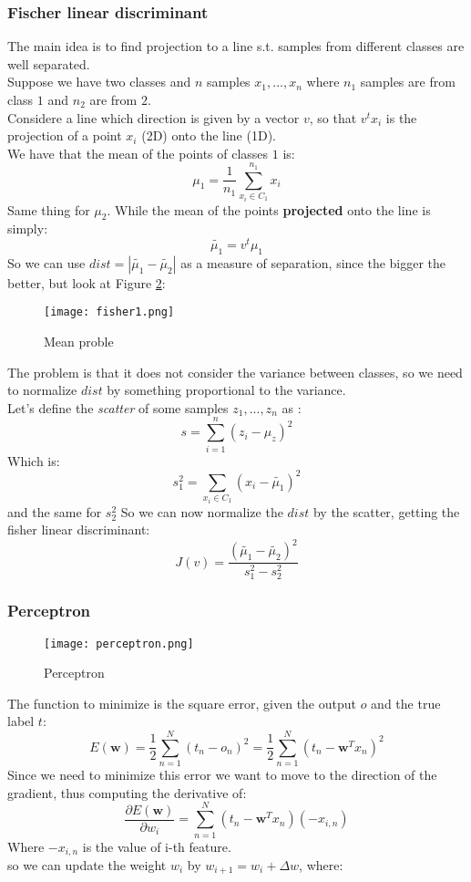 \subsubsection{Fischer linear discriminant}
The main idea is to find projection to a line s.t. samples from different classes are well separated.\\
Suppose we have two classes and $n$ samples $x_1,...,x_n$ where $n_1$ samples are from class $1$ and $n_2$ are from $2$.\\
Considere a line which direction is given by a vector $v$, so that $v^tx_i$ is the projection of a point $x_i$ (2D) onto the line (1D).\\
We have that the mean of the points of classes $1$ is:
\[\mu_1=\frac{1}{n_1}\sum_{x_i \in C_1}^{n_1}x_i\]
Same thing for $\mu_2$. While the mean of the points \textbf{projected} onto the line is simply:
\[\tilde{\mu_1}=v^t\mu_1\]
So we can use $dist=|\tilde{\mu_1} -\tilde{\mu_2}|$ as a measure of separation, since the bigger the better, but look at Figure \ref{fig:fisher1}:

\begin{figure}[H]
\texttt{[image: fisher1.png]}
\caption{Mean proble}
\label{fig:fisher1}
\end{figure}

The problem is that it does not consider the variance between classes, so we need to normalize $dist$ by something proportional to the variance.\\
Let's define the \textit{scatter} of some samples $z_1,...,z_n$ as :
\[s=\sum_{i=1}^n(z_i-\mu_z)^2\]
Which is:
\[s_1^2=\sum_{x_i \in C_1}(x_i-\tilde{\mu_1})^2\]
and the same for $s_2^2$
So we can now normalize the $dist$ by the scatter, getting the fisher linear discriminant:
\[J(v)=\frac{(\tilde{\mu_1}-\tilde{\mu_2})^2}{s_1^2-s_2^2}\]

\subsubsection{Perceptron}

\begin{figure}[H]
\texttt{[image: perceptron.png]}
\caption{Perceptron}
\label{fig:fisher1}
\end{figure}

The function to minimize is the square error, given the output $o$ and the true label $t$:
\[E(\bm{w})=\frac{1}{2}\sum_{n=1}^N(t_n-o_n)^2=\frac{1}{2}\sum_{n=1}^N(t_n -\bm{w}^Tx_n)^2\]
Since we need to minimize this error we want to move to the direction of the gradient, thus computing the derivative of:
$$\frac{\partial E(\bm{w}) }{\partial w_i}=\sum_{n=1}^N(t_n-\bm{w}^Tx_n)(-x_{i,n})$$
Where $-x_{i,n}$ is the value of i-th feature.\\
so we can update the weight $w_i$ by $w_{i+1}=w_i + \Delta w$, where:

